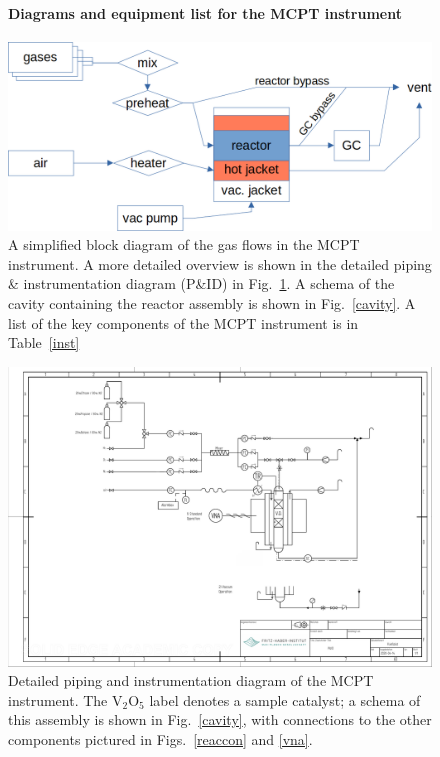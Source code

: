\documentclass[12pt]{article}
\begin{document}
\begin{figure}[p]
\paragraph{Diagrams and equipment list for the MCPT instrument \vspace{1em}}
\begin{center}
\includegraphics[width=0.8\linewidth]{block_diagram.png}
\caption{A simplified block diagram of the gas flows in the MCPT instrument. A more detailed overview is shown in the detailed piping \& instrumentation diagram (P\&ID) in Fig.~\ref{pnid}. A schema of the cavity containing the reactor assembly is shown in Fig.~\ref{cavity}. A list of the key components of the MCPT instrument is in Table~\ref{inst}}
\end{center}
\end{figure}

\begin{figure}[p]
\centering
\includegraphics[width=1.25\linewidth, trim={7cm 5cm 3cm 5cm}, angle=90]{p+id_3.pdf}\vspace{1em}
\caption{Detailed piping and instrumentation diagram of the MCPT instrument. The V$_2$O$_5$ label denotes a sample catalyst; a schema of this assembly is shown in Fig.~\ref{cavity}, with connections to the other components pictured in Figs.~\ref{reaccon} and \ref{vna}. \label{pnid}}
\end{figure}
\end{document}
